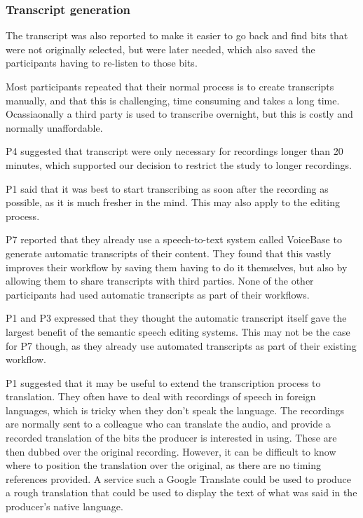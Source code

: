 \subsubsection{Transcript generation}


The transcript was also reported to make it easier to go back and find bits that were not originally selected, but were
later needed, which also saved the participants having to re-listen to those bits.

Most participants repeated that their normal process is to create transcripts manually, and that this is challenging,
time consuming and takes a long time. Ocassiaonally a third party is used to transcribe overnight, but this is costly
and normally unaffordable.

P4 suggested that transcript were only necessary for recordings longer than 20 minutes, which supported our decision to
restrict the study to longer recordings.

P1 said that it was best to start transcribing as soon after the recording as possible, as it is much fresher in the
mind. This may also apply to the editing process.


P7 reported that they already use a speech-to-text system called VoiceBase to generate automatic transcripts of their
content. They found that this vastly improves their workflow by saving them having to do it themselves, but also by
allowing them to share transcripts with third parties. None of the other participants had used automatic transcripts as
part of their workflows.


P1 and P3 expressed that they thought the automatic transcript itself gave the largest benefit of the semantic speech
editing systems. This may not be the case for P7 though, as they already use automated transcripts as part of their
existing workflow.


P1 suggested that it may be useful to extend the transcription process to translation. They often have to deal with
recordings of speech in foreign languages, which is tricky when they don't speak the language. The recordings are
normally sent to a colleague who can translate the audio, and provide a recorded translation of the bits the producer
is interested in using. These are then dubbed over the original recording. However, it can be difficult to know where
to position the translation over the original, as there are no timing references provided. A service such a Google
Translate could be used to produce a rough translation that could be used to display the text of what was said in the
producer's native language.

